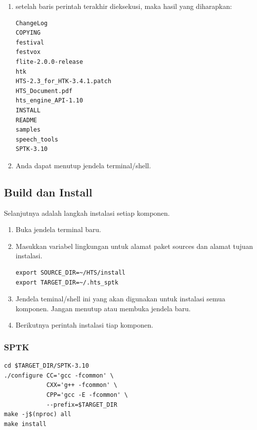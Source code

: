 \documentclass[12pt,]{article}
\begin{document}
\begin{enumerate}
		\newpage
		\item setelah baris perintah terakhir dieksekusi, maka hasil yang diharapkan:
		\begin{verbatim}
ChangeLog
COPYING
festival
festvox
flite-2.0.0-release
htk
HTS-2.3_for_HTK-3.4.1.patch
HTS_Document.pdf
hts_engine_API-1.10
INSTALL
README
samples
speech_tools
SPTK-3.10
		\end{verbatim}

		\item Anda dapat menutup jendela terminal/shell.

	\end{enumerate}

	\subsection{Build dan Install}

	Selanjutnya adalah langkah instalasi setiap komponen.

	\begin{enumerate}
		\item Buka jendela terminal baru.

		\item Masukkan variabel lingkungan untuk alamat paket sources dan alamat tujuan instalasi.
		\begin{verbatim}
export SOURCE_DIR=~/HTS/install
export TARGET_DIR=~/.hts_sptk
		\end{verbatim}

		\item Jendela teminal/shell ini yang akan digunakan untuk instalasi semua komponen.
		Jangan menutup atau membuka jendela baru.

		\item Berikutnya perintah instalasi tiap komponen.
	\end{enumerate}

	\subsubsection{SPTK}
	\begin{verbatim}
cd $TARGET_DIR/SPTK-3.10
./configure CC='gcc -fcommon' \
            CXX='g++ -fcommon' \
            CPP='gcc -E -fcommon' \
            --prefix=$TARGET_DIR
make -j$(nproc) all
make install
	\end{verbatim}
\end{document}
